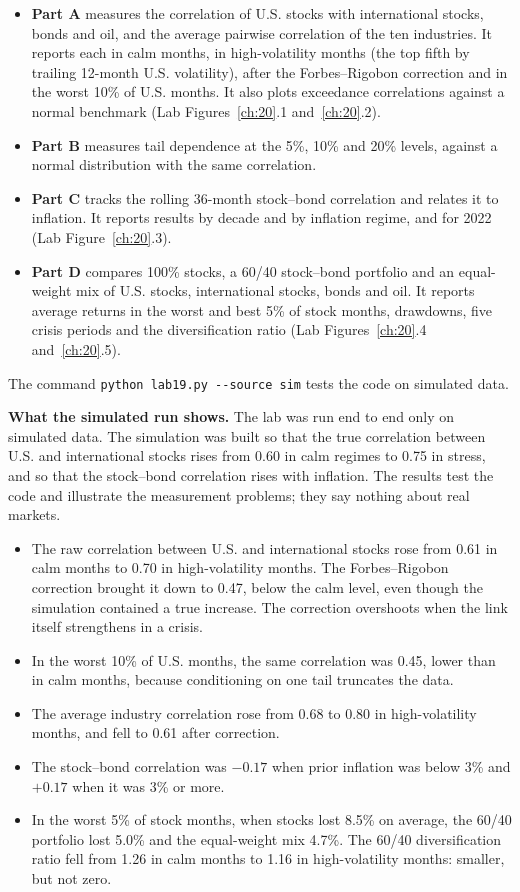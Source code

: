 \begin{itemize}
  \item \textbf{Part A} measures the correlation of U.S. stocks with international stocks, bonds and oil, and the average pairwise correlation of the ten industries. It reports each in calm months, in high-volatility months (the top fifth by trailing 12-month U.S. volatility), after the Forbes--Rigobon correction and in the worst 10\% of U.S. months. It also plots exceedance correlations against a normal benchmark (Lab Figures~\ref{ch:20}.1 and~\ref{ch:20}.2).
  \item \textbf{Part B} measures tail dependence at the 5\%, 10\% and 20\% levels, against a normal distribution with the same correlation.
  \item \textbf{Part C} tracks the rolling 36-month stock--bond correlation and relates it to inflation. It reports results by decade and by inflation regime, and for 2022 (Lab Figure~\ref{ch:20}.3).
  \item \textbf{Part D} compares 100\% stocks, a 60/40 stock--bond portfolio and an equal-weight mix of U.S. stocks, international stocks, bonds and oil. It reports average returns in the worst and best 5\% of stock months, drawdowns, five crisis periods and the diversification ratio (Lab Figures~\ref{ch:20}.4 and~\ref{ch:20}.5).
\end{itemize}

The command \texttt{python lab19.py -{}-source sim} tests the code on simulated data.

\textbf{What the simulated run shows.} The lab was run end to end only on simulated data. The simulation was built so that the true correlation between U.S. and international stocks rises from 0.60 in calm regimes to 0.75 in stress, and so that the stock--bond correlation rises with inflation. The results test the code and illustrate the measurement problems; they say nothing about real markets.

\begin{itemize}
  \item The raw correlation between U.S. and international stocks rose from 0.61 in calm months to 0.70 in high-volatility months. The Forbes--Rigobon correction brought it down to 0.47, below the calm level, even though the simulation contained a true increase. The correction overshoots when the link itself strengthens in a crisis.
  \item In the worst 10\% of U.S. months, the same correlation was 0.45, lower than in calm months, because conditioning on one tail truncates the data.
  \item The average industry correlation rose from 0.68 to 0.80 in high-volatility months, and fell to 0.61 after correction.
  \item The stock--bond correlation was $-0.17$ when prior inflation was below 3\% and $+0.17$ when it was 3\% or more.
  \item In the worst 5\% of stock months, when stocks lost 8.5\% on average, the 60/40 portfolio lost 5.0\% and the equal-weight mix 4.7\%. The 60/40 diversification ratio fell from 1.26 in calm months to 1.16 in high-volatility months: smaller, but not zero.
\end{itemize}

